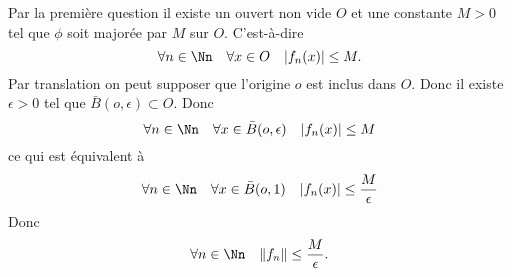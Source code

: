 {{Par la première question il existe un ouvert non vide $O$ et une constante $M>0$ tel que
$\phi$ soit majorée par $M$ sur $O$.
C'est-à-dire
$$\forall n\in \Nn \quad \forall x \in O \quad |f_n(x)| \le M.$$
Par translation on peut supposer que l'origine $o$ est inclus dans $O$. Donc il existe $\epsilon >0$ tel que $\bar B(o,\epsilon) \subset O$. Donc
$$\forall n\in \Nn \quad \forall x \in \bar B(o,\epsilon) \quad |f_n(x)| \le M$$
ce qui est équivalent à 
$$\forall n\in \Nn \quad \forall x \in \bar B(o,1) \quad |f_n(x)| \le \frac M \epsilon$$
Donc $$\forall n\in \Nn \quad  \|f_n\| \le \frac M \epsilon.$$
}
}
